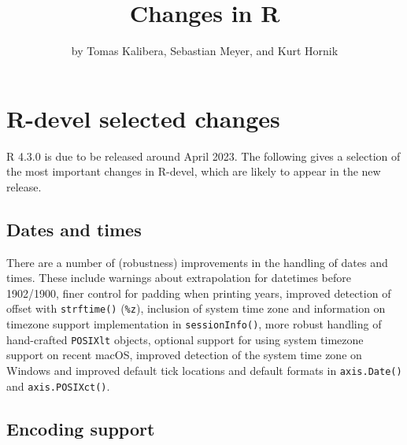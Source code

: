 \title{Changes in R}
\author{by Tomas Kalibera, Sebastian Meyer, and Kurt Hornik}

\maketitle


\hypertarget{r-devel-selected-changes}{%
\section{R-devel selected changes}\label{r-devel-selected-changes}}

R 4.3.0 is due to be released around April 2023. The following gives a
selection of the most important changes in R-devel, which are likely to
appear in the new release.

\hypertarget{dates-and-times}{%
\subsection{Dates and times}\label{dates-and-times}}

There are a number of (robustness) improvements in the handling of dates
and times. These include warnings about extrapolation for datetimes before
1902/1900, finer control for padding when printing years, improved detection
of offset with \texttt{strftime()} (\texttt{\%z}), inclusion of system time zone and
information on timezone support implementation in \texttt{sessionInfo()}, more
robust handling of hand-crafted \texttt{POSIXlt} objects, optional support for
using system timezone support on recent macOS, improved detection of the
system time zone on Windows and improved default tick locations and default
formats in \texttt{axis.Date()} and \texttt{axis.POSIXct()}.

\hypertarget{encoding-support}{%
\subsection{Encoding support}\label{encoding-support}}

